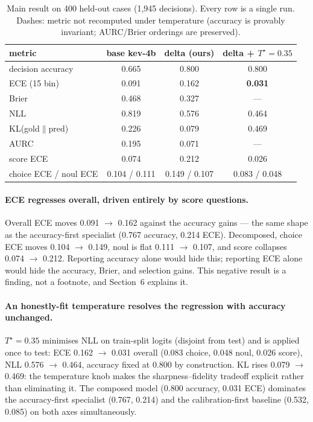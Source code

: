 \begin{table}[t]
\centering\small
\begin{tabular}{lccc}
\toprule
metric & base kev-4b & delta (ours) & delta + $T^\star{=}0.35$ \\
\midrule
decision accuracy & 0.665 & 0.800 & 0.800 \\
ECE (15 bin) & 0.091 & 0.162 & \textbf{0.031} \\
Brier & 0.468 & 0.327 & --- \\
NLL & 0.819 & 0.576 & 0.464 \\
KL(gold$\|$pred) & 0.226 & 0.079 & 0.469 \\
AURC & 0.195 & 0.071 & --- \\
score ECE & 0.074 & 0.212 & 0.026 \\
choice ECE / noul ECE & 0.104 / 0.111 & 0.149 / 0.107 & 0.083 / 0.048 \\
\bottomrule
\end{tabular}
\caption{Main result on 400 held-out cases (1,945 decisions). Every row is
a single run. Dashes: metric not recomputed under temperature (accuracy is
provably invariant; AURC/Brier orderings are preserved).}
\label{tab:main}
\end{table}

\paragraph{ECE regresses overall, driven entirely by score questions.}
Overall ECE moves 0.091 $\to$ 0.162 against the accuracy gains — the same
shape as the accuracy-first specialist (0.767 accuracy, 0.214 ECE).
Decomposed, choice ECE moves 0.104 $\to$ 0.149, noul is flat
0.111 $\to$ 0.107, and score collapses 0.074 $\to$ 0.212. Reporting accuracy
alone would hide this; reporting ECE alone would hide the accuracy, Brier,
and selection gains. This negative result is a finding, not a footnote,
and Section~6 explains it.

\paragraph{An honestly-fit temperature resolves the regression with
accuracy unchanged.} $T^\star = 0.35$ minimises NLL on train-split logits
(disjoint from test) and is applied once to test: ECE 0.162 $\to$ 0.031
overall (0.083 choice, 0.048 noul, 0.026 score), NLL 0.576 $\to$ 0.464,
accuracy fixed at 0.800 by construction. KL rises 0.079 $\to$ 0.469: the
temperature knob makes the sharpness–fidelity tradeoff explicit rather than
eliminating it. The composed model (0.800 accuracy, 0.031 ECE) dominates
the accuracy-first specialist (0.767, 0.214) and the calibration-first
baseline (0.532, 0.085) on both axes simultaneously.
